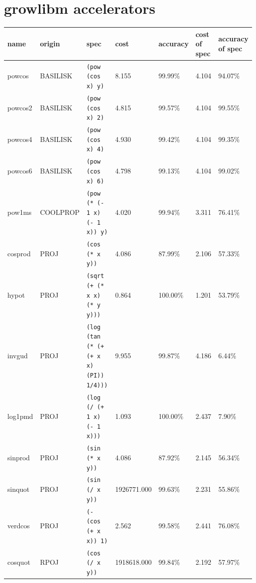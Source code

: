 \documentclass{article}
\begin{document}
\section*{growlibm accelerators}
\begin{tabular}{lllllll}
\hline
name & origin & spec & cost & accuracy & cost of spec & accuracy of spec \\
\hline
powcos & BASILISK & \texttt{(pow (cos x) y)} & 8.155 & 99.99\% & 4.104 & 94.07\% \\
powcos2 & BASILISK & \texttt{(pow (cos x) 2)} & 4.815 & 99.57\% & 4.104 & 99.55\% \\
powcos4 & BASILISK & \texttt{(pow (cos x) 4)} & 4.930 & 99.42\% & 4.104 & 99.35\% \\
powcos6 & BASILISK & \texttt{(pow (cos x) 6)} & 4.798 & 99.13\% & 4.104 & 99.02\% \\
pow1ms & COOLPROP & \texttt{(pow (* (- 1 x) (- 1 x)) y)} & 4.020 & 99.94\% & 3.311 & 76.41\% \\
cosprod & PROJ & \texttt{(cos (* x y))} & 4.086 & 87.99\% & 2.106 & 57.33\% \\
hypot & PROJ & \texttt{(sqrt (+ (* x x) (* y y)))} & 0.864 & 100.00\% & 1.201 & 53.79\% \\
invgud & PROJ & \texttt{(log (tan (* (+ (+ x x) (PI)) 1/4)))} & 9.955 & 99.87\% & 4.186 & 6.44\% \\
log1pmd & PROJ & \texttt{(log (/ (+ 1 x) (- 1 x)))} & 1.093 & 100.00\% & 2.437 & 7.90\% \\
sinprod & PROJ & \texttt{(sin (* x y))} & 4.086 & 87.92\% & 2.145 & 56.34\% \\
sinquot & PROJ & \texttt{(sin (/ x y))} & 1926771.000 & 99.63\% & 2.231 & 55.86\% \\
verdcos & PROJ & \texttt{(- (cos (+ x x)) 1)} & 2.562 & 99.58\% & 2.441 & 76.08\% \\
cosquot & RPOJ & \texttt{(cos (/ x y))} & 1918618.000 & 99.84\% & 2.192 & 57.97\% \\
\hline
\end{tabular}
\end{document}
